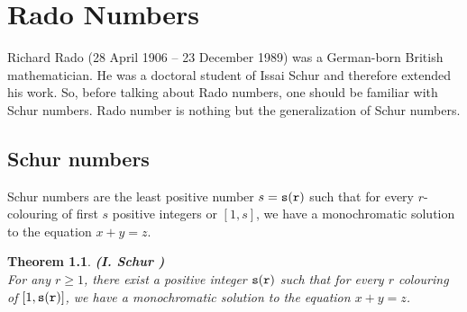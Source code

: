 \documentclass[12pt]{report}
\newtheorem{thm}{Theorem}[chapter]
\begin{document}


\chapter{Rado Numbers}

\noindent Richard Rado (28 April 1906 -- 23 December 1989) was a German-born British mathematician. He was a doctoral student of Issai Schur and therefore extended his work. So, before talking about Rado numbers, one should be familiar with Schur numbers. Rado number is nothing but the generalization of Schur numbers.

\section{Schur numbers}

\noindent Schur numbers are the least positive number $s=\tt{s(r)}$ such that for every $r$-colouring of first $s$ positive integers or $[1,s]$, we have a monochromatic solution to the equation $x+y=z$.

\begin{thm} {\bf (I. Schur \cite{IS})}\\[5pt] 
For any $ r\ge 1$, there exist a positive integer $\tt{s(r)}$ such that for every $r$ colouring of $[1,\tt{s(r)}]$, we have a monochromatic solution to the equation $ x+y=z$.
\end{thm}
\end{document}
